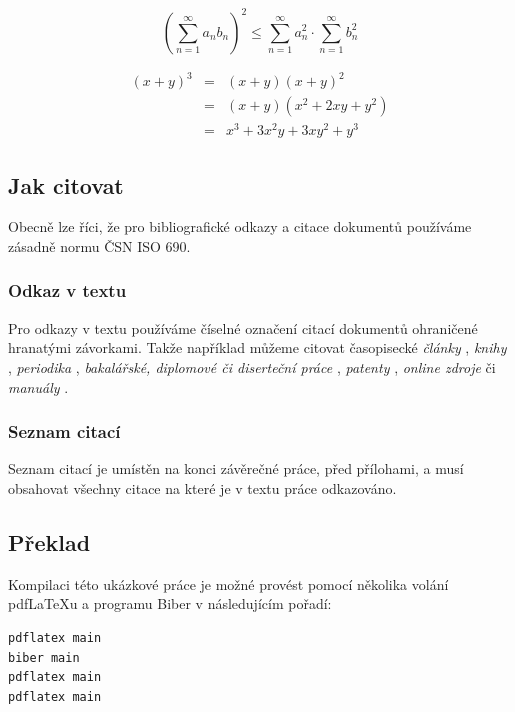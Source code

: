 \documentclass[czech,master,dept460,male,cpp,cpdeclaration]{diploma}
\begin{document}
\begin{equation}
  \left(\sum_{n=1}^{\infty}a_{n}b_{n}\right)^{2} \leq
  \sum_{n=1}^{\infty}a_{n}^{2} \cdot \sum_{n=1}^{\infty}b_{n}^{2}
  \label{eq:A}
\end{equation}

\begin{eqnarray}
  (x+y)^{3} & = & (x+y)(x+y)^{2}\label{eq:B}\\
  & = & (x+y)(x^{2}+2xy+y^{2})\nonumber\\
  & = & x^{3}+3x^{2}y+3xy^{2}+y^{3}\label{eq:C}
\end{eqnarray}
\subsection{Jak citovat}
Obecně lze říci, že pro bibliografické odkazy a citace dokumentů používáme zásadně normu ČSN ISO 690.
\subsubsection{Odkaz v textu}
Pro odkazy v textu používáme číselné označení citací dokumentů ohraničené hranatými závorkami. Takže například můžeme citovat časopisecké \emph{články} \cite{herrmann, bertram, moore, yoon, sigfridsson, baez/article}, \emph{knihy} \cite{wilde, nietzsche:ksa1, averroes/bland, hammond, cotton, knuth:ct:a, gerhardt, gonzalez, companion}, \emph{periodika} \cite{jcg}, \emph{bakalářské, diplomové či diserteční práce} \cite{geer}, \emph{patenty} \cite{kowalik, almendro, sorace, laufenberg}, \emph{online zdroje} \cite{ctan, wassenberg, itzhaki, markey, baez/online} či \emph{manuály} \cite{cms}.

\subsubsection{Seznam citací}
Seznam citací je umístěn na konci závěrečné práce, před přílohami, a musí obsahovat všechny citace na které je v textu práce odkazováno.  

\subsection{Překlad}
Kompilaci této ukázkové práce je možné provést pomocí několika volání pdf\LaTeX{}u a programu Biber v následujícím pořadí:
\begin{verbatim}
pdflatex main
biber main
pdflatex main
pdflatex main
\end{verbatim}


\printbibliography[title={Literatura}, heading=bibintoc]


\appendix
\end{document}

